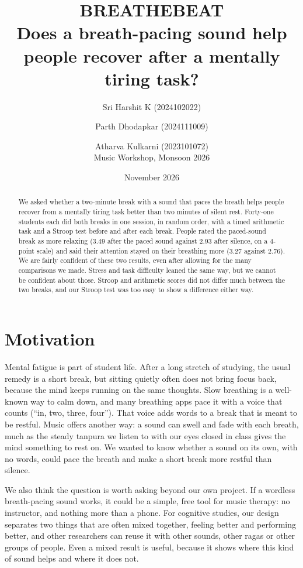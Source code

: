 \documentclass[11pt,a4paper]{article}
\title{\textbf{BREATHEBEAT}\\[4pt]\large Does a breath-pacing sound help people recover after a mentally tiring task?}
\author{Sri Harshit K (2024102022) \and Parth Dhodapkar (2024111009) \and Atharva Kulkarni (2023101072)\\[4pt]
\small Music Workshop, Monsoon 2026}
\date{November 2026}
\begin{document}
\maketitle

\begin{abstract}
\noindent We asked whether a two-minute break with a sound that paces the breath helps people recover from a mentally tiring task better than two minutes of silent rest. Forty-one students each did both breaks in one session, in random order, with a timed arithmetic task and a Stroop test before and after each break. People rated the paced-sound break as more relaxing (3.49 after the paced sound against 2.93 after silence, on a 4-point scale) and said their attention stayed on their breathing more (3.27 against 2.76). We are fairly confident of these two results, even after allowing for the many comparisons we made. Stress and task difficulty leaned the same way, but we cannot be confident about those. Stroop and arithmetic scores did not differ much between the two breaks, and our Stroop test was too easy to show a difference either way.
\end{abstract}

\section{Motivation}

Mental fatigue is part of student life. After a long stretch of studying, the usual remedy is a short break, but sitting quietly often does not bring focus back, because the mind keeps running on the same thoughts. Slow breathing is a well-known way to calm down, and many breathing apps pace it with a voice that counts (``in, two, three, four''). That voice adds words to a break that is meant to be restful. Music offers another way: a sound can swell and fade with each breath, much as the steady tanpura we listen to with our eyes closed in class gives the mind something to rest on. We wanted to know whether a sound on its own, with no words, could pace the breath and make a short break more restful than silence.

We also think the question is worth asking beyond our own project. If a wordless breath-pacing sound works, it could be a simple, free tool for music therapy: no instructor, and nothing more than a phone. For cognitive studies, our design separates two things that are often mixed together, feeling better and performing better, and other researchers can reuse it with other sounds, other ragas or other groups of people. Even a mixed result is useful, because it shows where this kind of sound helps and where it does not.
\end{document}
